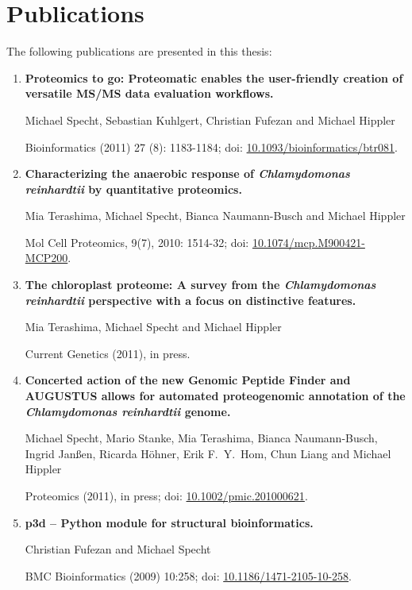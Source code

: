 \cleardoublepage
\chapter{Publications}

The following publications are presented in this thesis:

\begin{enumerate}
\item 
{\bf Proteomics to go: Proteomatic enables the user-friendly creation of versatile MS/MS data evaluation workflows.}

Michael Specht, Sebastian Kuhlgert, Christian Fufezan and Michael Hippler

Bioinformatics (2011) 27 (8): 1183-1184; doi: \href{http://dx.doi.org/10.1093/bioinformatics/btr081}{10.1093/bioinformatics/btr081}.

\item
{\bf Characterizing the anaerobic response of {\em Chlamydomonas reinhardtii} by quantitative proteomics.}

Mia Terashima, Michael Specht, Bianca Naumann-Busch and Michael Hippler

Mol Cell Proteomics, 9(7), 2010: 1514-32; doi: \href{http://dx.doi.org/10.1074/mcp.M900421-MCP200}{10.1074/mcp.M900421-MCP200}.

\item
{\bf The chloroplast proteome: A survey from the {\em Chlamydomonas reinhardtii} perspective with a focus on distinctive features.}

Mia Terashima, Michael Specht and Michael Hippler

Current Genetics (2011), in press.

\item
{\bf Concerted action of the new Genomic Peptide Finder and AUGUSTUS allows for automated proteogenomic annotation of the {\em Chlamydomonas reinhardtii} genome.}

Michael Specht, Mario Stanke, Mia Terashima, Bianca Naumann-Busch, Ingrid Janßen, Ricarda H\"ohner, Erik F.~Y.~Hom, Chun Liang and Michael Hippler

Proteomics (2011), in press; doi: \href{http://dx.doi.org/10.1002/pmic.201000621}{10.1002/pmic.201000621}.

% 
\item
{\bf p3d -- Python module for structural bioinformatics.}

Christian Fufezan and Michael Specht

BMC Bioinformatics (2009) 10:258; doi: \href{http://dx.doi.org/10.1186/1471-2105-10-258}{10.1186/1471-2105-10-258}.

\end{enumerate}

